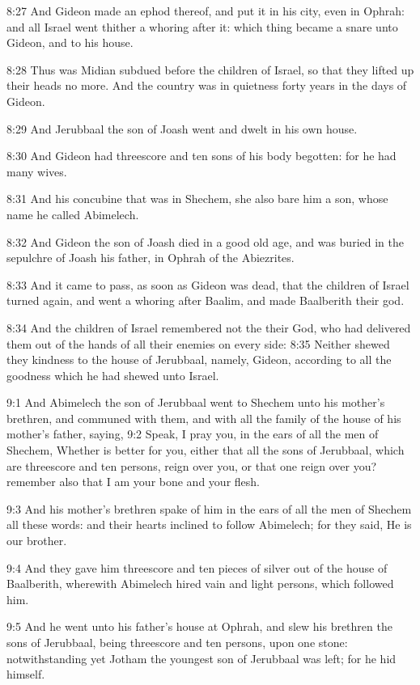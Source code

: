 8:27 And Gideon made an ephod thereof, and put it in his city, even in Ophrah: and all Israel went thither a whoring after it: which thing became a snare unto Gideon, and to his house.

8:28 Thus was Midian subdued before the children of Israel, so that they lifted up their heads no more. And the country was in quietness forty years in the days of Gideon.

8:29 And Jerubbaal the son of Joash went and dwelt in his own house.

8:30 And Gideon had threescore and ten sons of his body begotten: for he had many wives.

8:31 And his concubine that was in Shechem, she also bare him a son, whose name he called Abimelech.

8:32 And Gideon the son of Joash died in a good old age, and was buried in the sepulchre of Joash his father, in Ophrah of the Abiezrites.

8:33 And it came to pass, as soon as Gideon was dead, that the children of Israel turned again, and went a whoring after Baalim, and made Baalberith their god.

8:34 And the children of Israel remembered not the \LORD their God, who had delivered them out of the hands of all their enemies on every side: 8:35 Neither shewed they kindness to the house of Jerubbaal, namely, Gideon, according to all the goodness which he had shewed unto Israel.

9:1 And Abimelech the son of Jerubbaal went to Shechem unto his mother's brethren, and communed with them, and with all the family of the house of his mother's father, saying, 9:2 Speak, I pray you, in the ears of all the men of Shechem, Whether is better for you, either that all the sons of Jerubbaal, which are threescore and ten persons, reign over you, or that one reign over you? remember also that I am your bone and your flesh.

9:3 And his mother's brethren spake of him in the ears of all the men of Shechem all these words: and their hearts inclined to follow Abimelech; for they said, He is our brother.

9:4 And they gave him threescore and ten pieces of silver out of the house of Baalberith, wherewith Abimelech hired vain and light persons, which followed him.

9:5 And he went unto his father's house at Ophrah, and slew his brethren the sons of Jerubbaal, being threescore and ten persons, upon one stone: notwithstanding yet Jotham the youngest son of Jerubbaal was left; for he hid himself.


